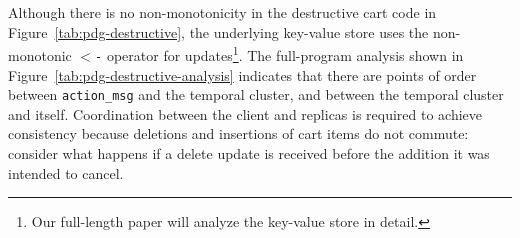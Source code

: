 

Although there is no 
non-monotonicity in the destructive cart code in
Figure~\ref{tab:pdg-destructive}, the underlying key-value store uses the
non-monotonic \texttt{$<$-} operator for updates\footnote{Our full-length paper
will analyze the key-value store in detail.}.  The full-program analysis shown
in Figure~\ref{tab:pdg-destructive-analysis} indicates that there are points of
order between \texttt{action\_msg} and the temporal cluster, and between the
temporal cluster and itself.
Coordination between the client and replicas is required to achieve consistency
because deletions and insertions of cart items do not commute: consider what
happens if a delete update is received before the addition it was intended to
cancel.

